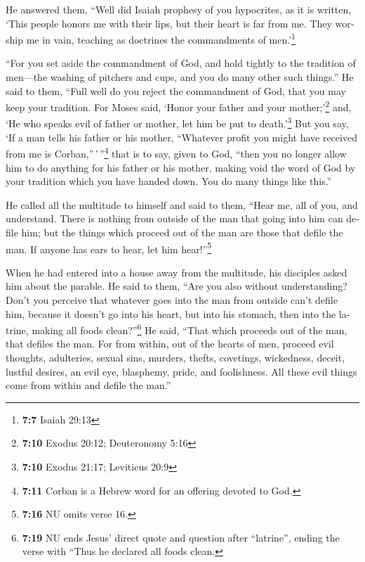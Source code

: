 \begin{paracol}{2}
\begin{otherlanguage}{english}
 He answered them, ``Well did Isaiah prophesy of you
hypocrites, as it is written, `This people honors me with their lips,
but their heart is far from me.  They worship me in vain,
teaching as doctrines the commandments of men.'\footnote{\textbf{7:7}
  Isaiah 29:13}

 ``For you set aside the commandment of God, and hold
tightly to the tradition of men---the washing of pitchers and cups, and
you do many other such things.''  He said to them, ``Full
well do you reject the commandment of God, that you may keep your
tradition.  For Moses said, `Honor your father and your
mother;'\footnote{\textbf{7:10} Exodus 20:12; Deuteronomy 5:16} and, `He
who speaks evil of father or mother, let him be put to
death.'\footnote{\textbf{7:10} Exodus 21:17; Leviticus 20:9}
 But you say, `If a man tells his father or his mother,
``Whatever profit you might have received from me is
Corban,''\,'\,''\footnote{\textbf{7:11} Corban is a Hebrew word for an
  offering devoted to God.} that is to say, given to God,
 ``then you no longer allow him to do anything for his
father or his mother,  making void the word of God by
your tradition which you have handed down. You do many things like
this.''

 He called all the multitude to himself and said to them,
``Hear me, all of you, and understand.  There is nothing
from outside of the man that going into him can defile him; but the
things which proceed out of the man are those that defile the man.
 If anyone has ears to hear, let him hear!''\footnote{\textbf{7:16}
  NU omits verse 16.}

 When he had entered into a house away from the
multitude, his disciples asked him about the parable.  He
said to them, ``Are you also without understanding? Don't you perceive
that whatever goes into the man from outside can't defile him,
 because it doesn't go into his heart, but into his
stomach, then into the latrine, making all foods clean?''\footnote{\textbf{7:19}
  NU ends Jesus' direct quote and question after ``latrine'', ending the
  verse with ``Thus he declared all foods clean.}  He
said, ``That which proceeds out of the man, that defiles the man.
 For from within, out of the hearts of men, proceed evil
thoughts, adulteries, sexual sins, murders, thefts, 
covetings, wickedness, deceit, lustful desires, an evil eye, blasphemy,
pride, and foolishness.  All these evil things come from
within and defile the man.''


\end{otherlanguage}
\end{paracol}
